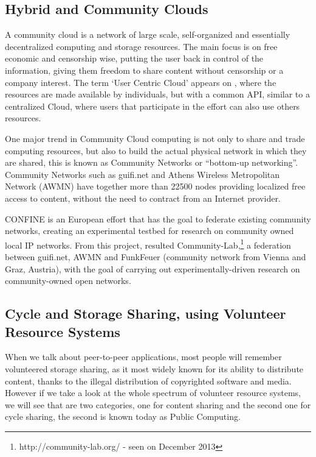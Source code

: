 \subsection{Hybrid and Community Clouds}

A community cloud is a network of large scale, self-organized and essentially decentralized computing and storage resources. The main focus is on free economic and censorship wise, putting the user back in control of the information, giving them freedom to share content without censorship or a company interest. The term `User Centric Cloud' appears on \cite{Barraca2011}, where the resources are made available by individuals, but with a common API, similar to a centralized Cloud, where users that participate in the effort can also use others resources.

One major trend in Community Cloud computing is not only to share and trade computing resources, but also to build the actual physical network in which they are shared, this is known as Community Networks or ``bottom-up networking''. Community Networks such as guifi.net and Athens Wireless Metropolitan Network (AWMN) have together more than 22500 nodes providing localized free access to content, without the need to contract from an Internet provider.

CONFINE\cite{Navarro} is an European effort that has the goal to federate existing community networks, creating an experimental testbed for research on community owned local IP networks. From this project, resulted Community-Lab,\footnote{http://community-lab.org/ - seen on December 2013} a federation between guifi.net, AWMN and FunkFeuer (community network from Vienna and Graz, Austria), with the goal of carrying out experimentally-driven research on community-owned open networks.



\subsection{Cycle and Storage Sharing, using Volunteer Resource Systems}

When we talk about peer-to-peer applications, most people will remember volunteered storage sharing, as it most widely known for its ability to distribute content, thanks to the illegal distribution of copyrighted software and media. However if we take a look at the whole spectrum of volunteer resource systems, we will see that are two categories, one for content sharing and the second one for cycle sharing, the second is known today as Public Computing.

